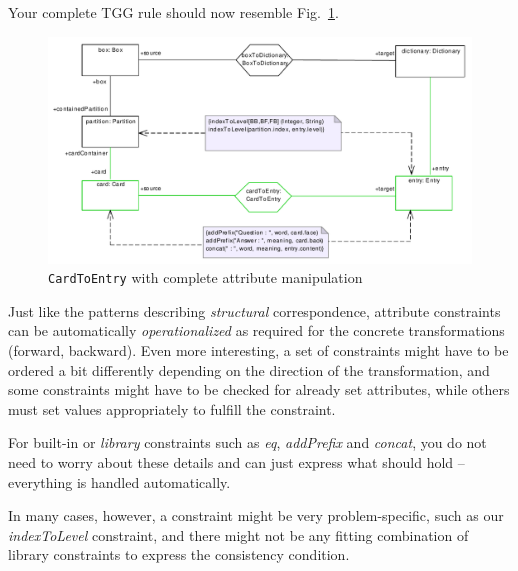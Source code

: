 Your complete TGG rule should now resemble Fig.~\ref{fig:cardtoentry_complete}.
\begin{figure}[htbp]
\begin{center}
  \includegraphics[width=\textwidth]{pics/tggBilder/tggRule/tgg21}
  \caption{\texttt{CardToEntry} with complete attribute manipulation}  
  \label{fig:cardtoentry_complete}
\end{center}
\end{figure}

Just like the patterns describing \emph{structural} correspondence,  attribute constraints can be automatically \emph{operationalized} as required for the concrete transformations (forward, backward).
Even more interesting, a set of constraints might have to be ordered a bit differently depending on the direction of the transformation, and some constraints might have to be checked for already set attributes, while others must set values appropriately to fulfill the constraint.

For built-in or \emph{library} constraints such as \emph{eq}, \emph{addPrefix} and \emph{concat}, you do not need to worry about these details and can just express what should hold -- everything is handled automatically.

In many cases, however, a constraint might be very problem-specific, such as our \emph{indexToLevel} constraint, and there might not be any fitting combination of library constraints to express the consistency condition.

